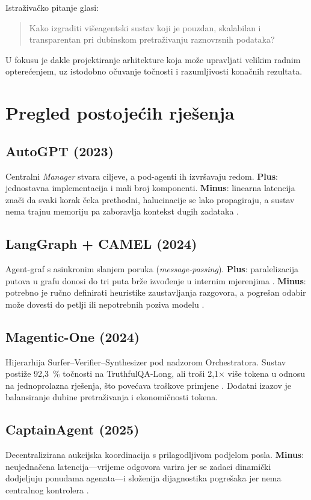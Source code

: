 \documentclass[zavrsnirad]{fer}
\begin{document}
\noindent
Istraživačko pitanje glasi:
\begin{quote}
Kako izgraditi višeagentski sustav koji je pouzdan, skalabilan i transparentan pri dubinskom pretraživanju raznovrsnih podataka?
\end{quote}
U fokusu je dakle projektiranje arhitekture koja može upravljati velikim radnim opterećenjem, uz istodobno očuvanje točnosti i razumljivosti konačnih rezultata.

\section{Pregled postojećih rješenja}
\label{sec:related}

\subsection*{AutoGPT (2023)}
Centralni \textit{Manager} stvara ciljeve, a pod-agenti ih izvršavaju redom.  
\textbf{Plus}: jednostavna implementacija i mali broj komponenti.  
\textbf{Minus}: linearna latencija znači da svaki korak čeka prethodni, halucinacije se lako propagiraju, a sustav nema trajnu memoriju pa zaboravlja kontekst dugih zadataka \cite{Piltch2023}.

\subsection*{LangGraph + CAMEL (2024)}
Agent-graf s asinkronim slanjem poruka (\textit{message-passing}).  
\textbf{Plus}: paralelizacija putova u grafu donosi do tri
puta brže izvođenje u internim mjerenjima \cite{LangGraph2024}.
\textbf{Minus}: potrebno je ručno definirati heuristike zaustavljanja razgovora, a pogrešan odabir može dovesti do petlji ili nepotrebnih poziva modelu \cite{Xu2023ReWOO}.

\subsection*{Magentic-One (2024)}
Hijerarhija Surfer–Verifier–Synthesizer pod nadzorom Orchestratora.  
Sustav postiže 92{,}3~\% točnosti na TruthfulQA-Long, ali troši 2{,}1× više tokena u odnosu na jednoprolazna rješenja, što povećava troškove primjene \cite{Fourney2024}.  
Dodatni izazov je balansiranje dubine pretraživanja i ekonomičnosti tokena.

\subsection*{CaptainAgent (2025)}
Decentralizirana aukcijska koordinacija s prilagodljivom podjelom posla.  
\textbf{Minus}: neujednačena latencija—vrijeme odgovora varira jer se zadaci dinamički dodjeljuju ponudama agenata—i složenija dijagnostika pogrešaka jer nema centralnog kontrolera \cite{Song2025}.
\end{document}
